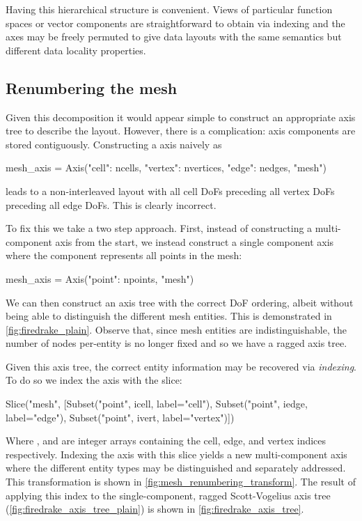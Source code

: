 \documentclass[thesis]{subfiles}
\begin{document}
Having this hierarchical structure is convenient.
Views of particular function spaces or vector components are straightforward to obtain via indexing and the axes may be freely permuted to give data layouts with the same semantics but different data locality properties.

\subsection{Renumbering the mesh}

Given this decomposition it would appear simple to construct an appropriate axis tree to describe the layout.
However, there is a complication: axis components are stored contiguously.
Constructing a  axis naively as
\begin{pyinline}
  mesh_axis = Axis({"cell": ncells, "vertex": nvertices, "edge": nedges},
                   "mesh")
\end{pyinline}
leads to a non-interleaved layout with all cell DoFs preceding all vertex DoFs preceding all edge DoFs.
This is clearly incorrect.

To fix this we take a two step approach.
First, instead of constructing a multi-component  axis from the start, we instead construct a single component axis where the component represents all points in the mesh:
\begin{pyinline}
  mesh_axis = Axis({"point": npoints}, "mesh")
\end{pyinline}
We can then construct an axis tree with the correct DoF ordering, albeit without being able to distinguish the different mesh entities.
This is demonstrated in \cref{fig:firedrake_plain}.
Observe that, since mesh entities are indistinguishable, the number of nodes per-entity is no longer fixed and so we have a ragged axis tree.

Given this axis tree, the correct entity information may be recovered via \emph{indexing}.
To do so we index the  axis with the slice:
\begin{pyinline}
  Slice("mesh", [Subset("point", icell, label="cell"),
                 Subset("point", iedge, label="edge"),
                 Subset("point", ivert, label="vertex")])
\end{pyinline}
Where ,  and  are integer arrays containing the cell, edge, and vertex indices respectively.
Indexing the  axis with this slice yields a new multi-component axis where the different entity types may be distinguished and separately addressed.
This transformation is shown in \cref{fig:mesh_renumbering_transform}.
The result of applying this index to the single-component, ragged Scott-Vogelius axis tree (\cref{fig:firedrake_axis_tree_plain}) is shown in \cref{fig:firedrake_axis_tree}.
\end{document}
